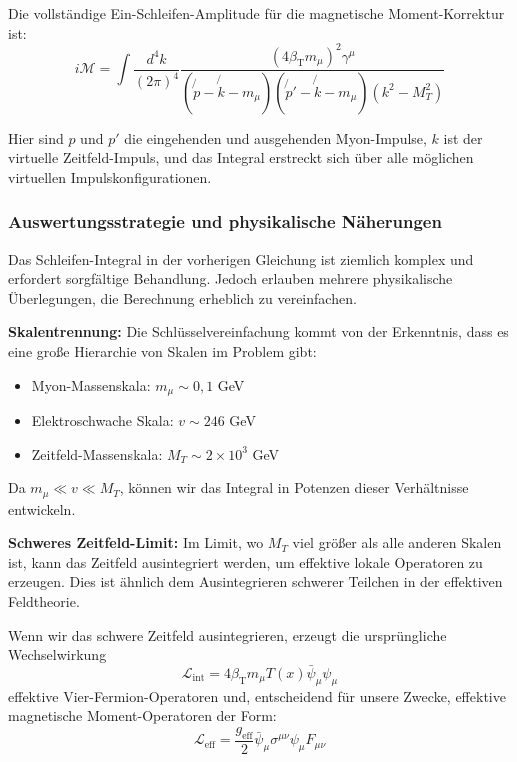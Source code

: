 \documentclass[12pt,a4paper]{article}
\newcommand{\Tfield}{T(x)}
\newcommand{\betaT}{\beta_{\text{T}}}
\begin{document}
	Die vollständige Ein-Schleifen-Amplitude für die magnetische Moment-Korrektur ist:
	\begin{equation}
		i\mathcal{M} = \int \frac{d^4k}{(2\pi)^4} \frac{(4\betaT m_{\mu})^2 \gamma^{\mu}}{(\not{p} - \not{k} - m_{\mu})(\not{p}' - \not{k} - m_{\mu})(k^2 - M_T^2)}
	\end{equation}
	
	Hier sind $p$ und $p'$ die eingehenden und ausgehenden Myon-Impulse, $k$ ist der virtuelle Zeitfeld-Impuls, und das Integral erstreckt sich über alle möglichen virtuellen Impulskonfigurationen.
	
	\subsubsection{Auswertungsstrategie und physikalische Näherungen}
	
	Das Schleifen-Integral in der vorherigen Gleichung ist ziemlich komplex und erfordert sorgfältige Behandlung. Jedoch erlauben mehrere physikalische Überlegungen, die Berechnung erheblich zu vereinfachen.
	
	\textbf{Skalentrennung:} Die Schlüsselvereinfachung kommt von der Erkenntnis, dass es eine große Hierarchie von Skalen im Problem gibt:
	\begin{itemize}
		\item Myon-Massenskala: $m_{\mu} \sim 0{,}1$ GeV
		\item Elektroschwache Skala: $v \sim 246$ GeV  
		\item Zeitfeld-Massenskala: $M_T \sim 2 \times 10^3$ GeV
	\end{itemize}
	
	Da $m_{\mu} \ll v \ll M_T$, können wir das Integral in Potenzen dieser Verhältnisse entwickeln.
	
	\textbf{Schweres Zeitfeld-Limit:} Im Limit, wo $M_T$ viel größer als alle anderen Skalen ist, kann das Zeitfeld ausintegriert werden, um effektive lokale Operatoren zu erzeugen. Dies ist ähnlich dem Ausintegrieren schwerer Teilchen in der effektiven Feldtheorie.
	
	Wenn wir das schwere Zeitfeld ausintegrieren, erzeugt die ursprüngliche Wechselwirkung
	\begin{equation}
		\mathcal{L}_{\text{int}} = 4\betaT m_{\mu} \Tfield \bar{\psi}_{\mu} \psi_{\mu}
	\end{equation}
	effektive Vier-Fermion-Operatoren und, entscheidend für unsere Zwecke, effektive magnetische Moment-Operatoren der Form:
	\begin{equation}
		\mathcal{L}_{\text{eff}} = \frac{g_{\text{eff}}}{2} \bar{\psi}_{\mu} \sigma^{\mu\nu} \psi_{\mu} F_{\mu\nu}
	\end{equation}
	
\end{document}
